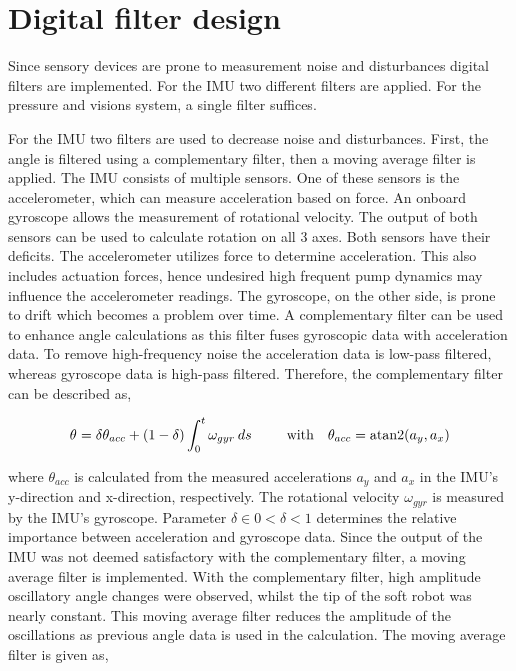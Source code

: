 \section{Digital filter design}

Since sensory devices are prone to measurement noise and disturbances digital filters are implemented. For the IMU two different filters are applied. For the pressure and visions system, a single filter suffices. 

For the IMU two filters are used to decrease noise and disturbances. First, the angle is filtered using a complementary filter, then a moving average filter is applied. The IMU consists of multiple sensors. One of these sensors is the accelerometer, which can measure acceleration based on force. An onboard gyroscope allows the measurement of rotational velocity. The output of both sensors can be used to calculate rotation on all 3 axes. Both sensors have their deficits. The accelerometer utilizes force to determine acceleration. This also includes actuation forces, hence undesired high frequent pump dynamics may influence the accelerometer readings. The gyroscope, on the other side, is prone to drift which becomes a problem over time. A complementary filter can be used to enhance angle calculations as this filter fuses gyroscopic data with acceleration data. To remove high-frequency noise the acceleration data is low-pass filtered, whereas gyroscope data is high-pass filtered. Therefore, the complementary filter can be described as, 

\begin{equation}
    \theta_{} = \delta \theta_{acc} + (1-\delta) \int_0^t \omega_{gyr} \hspace{2pt} ds    \hspace{25pt} \text{with}  \hspace{10pt} \theta_{acc} = \operatorname{atan2}(a_y,a_x)
\end{equation}

where $\theta_{acc}$ is calculated from the measured accelerations $a_y$ and $a_x$ in the IMU's y-direction and x-direction, respectively. The rotational velocity $\omega_{gyr}$ is measured by the IMU's gyroscope. Parameter $\delta \in 0 < \delta < 1$ determines the relative importance between acceleration and gyroscope data. Since the output of the IMU was not deemed satisfactory with the complementary filter, a moving average filter is implemented. With the complementary filter, high amplitude oscillatory angle changes were observed, whilst the tip of the soft robot was nearly constant. This moving average filter reduces the amplitude of the oscillations as previous angle data is used in the calculation. The moving average filter is given as,

